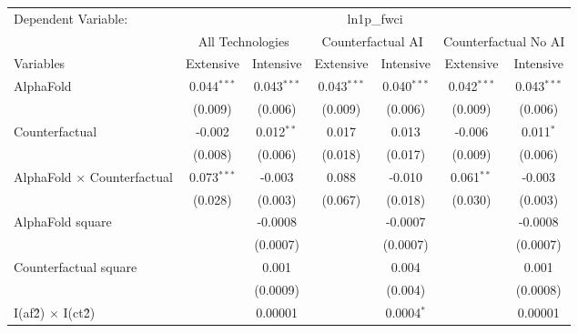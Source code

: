 \begingroup
\centering
\begin{tabular}{lcccccc}
   \tabularnewline \midrule \midrule
   Dependent Variable: & \multicolumn{6}{c}{ln1p\_fwci}\\
 & \multicolumn{2}{c}{All Technologies} & \multicolumn{2}{c}{Counterfactual AI} & \multicolumn{2}{c}{Counterfactual No AI} \\
\cmidrule(lr){1-1}\cmidrule(lr){2-3} \cmidrule(lr){4-5} \cmidrule(lr){6-7}
Variables & \multicolumn{1}{c}{Extensive} & \multicolumn{1}{c}{Intensive} & \multicolumn{1}{c}{Extensive} & \multicolumn{1}{c}{Intensive} & \multicolumn{1}{c}{Extensive} & \multicolumn{1}{c}{Intensive} \\
\cmidrule(lr){1-1}\cmidrule(lr){2-2} \cmidrule(lr){3-3} \cmidrule(lr){4-4} \cmidrule(lr){5-5} \cmidrule(lr){6-6} \cmidrule(lr){7-7}
   AlphaFold                          & 0.044$^{***}$ & 0.043$^{***}$ & 0.043$^{***}$ & 0.040$^{***}$ & 0.042$^{***}$ & 0.043$^{***}$\\   
                                      & (0.009)       & (0.006)       & (0.009)       & (0.006)       & (0.009)       & (0.006)\\   
   Counterfactual                     & -0.002        & 0.012$^{**}$  & 0.017         & 0.013         & -0.006        & 0.011$^{*}$\\   
                                      & (0.008)       & (0.006)       & (0.018)       & (0.017)       & (0.009)       & (0.006)\\   
   AlphaFold $\times$ Counterfactual  & 0.073$^{***}$ & -0.003        & 0.088         & -0.010        & 0.061$^{**}$  & -0.003\\   
                                      & (0.028)       & (0.003)       & (0.067)       & (0.018)       & (0.030)       & (0.003)\\   
   AlphaFold square                   &               & -0.0008       &               & -0.0007       &               & -0.0008\\   
                                      &               & (0.0007)      &               & (0.0007)      &               & (0.0007)\\   
   Counterfactual square              &               & 0.001         &               & 0.004         &               & 0.001\\   
                                      &               & (0.0009)      &               & (0.004)       &               & (0.0008)\\   
   I(af\^2) $\times$ I(ct\^2)         &               & 0.00001       &               & 0.0004$^{*}$  &               & 0.00001\\   

\end{tabular}
